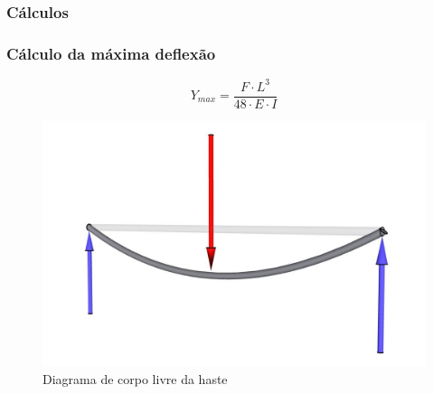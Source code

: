 \subsubsection{Cálculos}

\begin{frame}
\frametitle{Cálculo da máxima deflexão}
    $$Y_{max} = \frac{F \cdot L^{3}}{48 \cdot E \cdot I}$$
    \begin{figure}
        \centering
        \includegraphics[scale = 0.1]{figuras/diagramcorpolivre}
        \caption{Diagrama de corpo livre da haste}
    \end{figure}
\end{frame}

